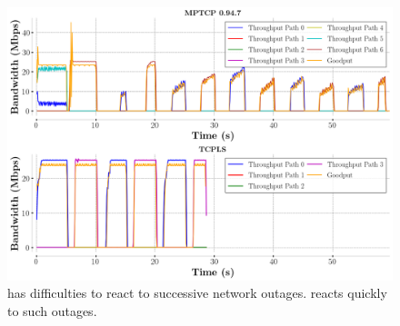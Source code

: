\begin{figure}[!t]
  \begin{center}
    \includegraphics[width=\columnwidth]{figures/tcpls_mptcp.png}
  \end{center}
  \caption{\mptcp has difficulties to react to successive network outages. 
  \tcpls reacts quickly to such outages.}
  \label{fig:failover}
\end{figure}

